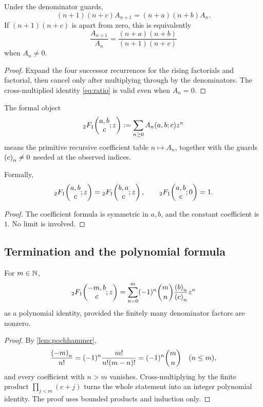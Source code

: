 \begin{lemma}\label{lem:ratio}
Under the denominator guards,
\begin{equation}\label{eq:ratio}
 (n+1)(n+c)A_{n+1}=(n+a)(n+b)A_n.
\end{equation}
If \((n+1)(n+c)\) is apart from zero, this is equivalently
\[
  \frac{A_{n+1}}{A_n}=\frac{(n+a)(n+b)}{(n+1)(n+c)}
\]
when \(A_n\ne0\).
\end{lemma}

\begin{proof}
Expand the four successor recurrences for the rising factorials and factorial,
then cancel only after multiplying through by the denominators.  The
cross-multiplied identity \eqref{eq:ratio} is valid even when \(A_n=0\).
\end{proof}

\begin{definition}\label{def:formal-gauss}
The formal object
\[
   {}_2F_1\!\left(\begin{matrix}a,b\\c\end{matrix};z\right):=\sum_{n\ge0}A_n(a,b;c)z^n
\]
means the primitive recursive coefficient table \(n\mapsto A_n\), together
with the guards \(\left(c\right)_{n}\ne0\) needed at the observed indices.
\end{definition}

\begin{proposition}\label{prop:symmetry}
Formally,
\[
 {}_2F_1\!\left(\begin{matrix}a,b\\c\end{matrix};z\right)={}_2F_1\!\left(\begin{matrix}b,a\\c\end{matrix};z\right),
 \qquad
 {}_2F_1\!\left(\begin{matrix}a,b\\c\end{matrix};0\right)=1.
\]
\end{proposition}

\begin{proof}
The coefficient formula is symmetric in \(a,b\), and the constant coefficient
is \(1\).  No limit is involved.
\end{proof}

\subsection{Termination and the polynomial formula}

\begin{theorem}\label{thm:termination}
For \(m\in\mathbb N\),
\begin{equation}\label{eq:terminating}
 {}_2F_1\!\left(\begin{matrix}-m,b\\c\end{matrix};z\right)
   =\sum_{n=0}^{m}(-1)^n\binom mn\frac{\left(b\right)_{n}}{\left(c\right)_{n}}z^n
\end{equation}
as a polynomial identity, provided the finitely many denominator factors are
nonzero.
\end{theorem}

\begin{proof}
By \cref{lem:pochhammer},
\[
 \frac{\left(-m\right)_{n}}{n!}
 =(-1)^n\frac{m!}{n!(m-n)!}=(-1)^n\binom mn
 \quad(n\le m),
\]
and every coefficient with \(n>m\) vanishes.  Cross-multiplying by the finite
product \(\prod_{j<m}(c+j)\) turns the whole statement into an integer
polynomial identity.  The proof uses bounded products and induction only.
\end{proof}

